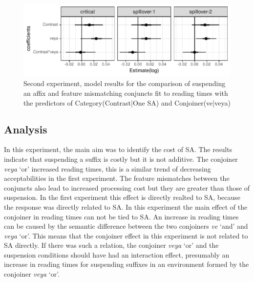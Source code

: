 \begin{knitrout}
\color{fgcolor}\begin{figure}[hbt!]

{\centering \includegraphics[]{experiments/selfpaced/report/figure/saVcontrast-1.pdf} 

}

\caption[Second experiment, model results for the comparison of suspending an affix and feature mismatching conjuncts fit to reading times with the predictors of Category(Contrast|One SA) and Conjoiner(ve|veya)]{Second experiment, model results for the comparison of suspending an affix and feature mismatching conjuncts fit to reading times with the predictors of Category(Contrast|One SA) and Conjoiner(ve|veya)}\label{fig:saVcontrast}
\end{figure}


\end{knitrout}

\subsection{Analysis}

In this experiment, the main aim was to identify the cost of SA. The results indicate that suspending a suffix is costly but it is not additive. The conjoiner \textit{veya} `or' increased reading times, this is a similar trend of decreasing acceptabilities in the first experiment. The feature mismatches between the conjuncts also lead to increased processing cost but they are greater than those of suspension. In the first experiment this effect is directly realted to SA, because the response was directly related to SA. In this experiment the main effect of the conjoiner in reading times can not be tied to SA. An increase in reading times can be caused by the semantic difference between the two conjoiners \textit{ve} `and' and \textit{veya} `or'. This means that the conjoiner effect in this experiment is not related to SA directly. If there was such a relation, the conjoiner \textit{veya} `or' and the suspension conditions should have had an interaction effect, presumably an increase in reading times for suspending suffixes in an environment formed by the conjoiner \textit{veya} `or'.









